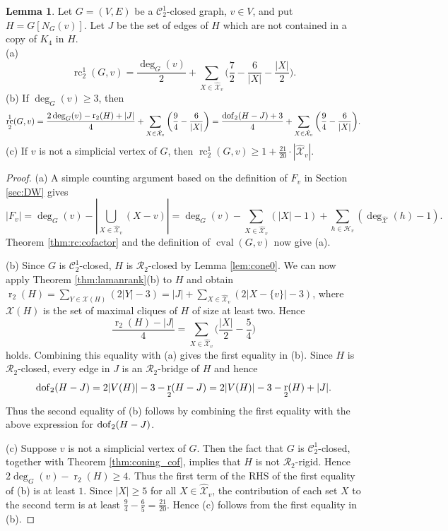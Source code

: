 \documentclass[11pt,a4paper]{article}
\theoremstyle{definition}
\newtheorem{lemma}[theorem]{Lemma}
\DeclareMathOperator{\rr}{r}
\DeclareMathOperator{\rc}{rc}
\DeclareMathOperator{\cval}{cval}
\newcommand{\cR}{\mathcal{R}}
\newcommand{\dof}{{\rm dof}}
\newcommand{\XX}{\mathcal{X}}
\newcommand{\hXX}{\hat{\mathcal{X}}}
\newcommand{\cC}{\mathcal{C}}
\newcommand{\HH}{\mathcal{H}}
\begin{document}
\begin{lemma}\label{lem:cof:bounds}
Let $G=(V,E)$ be a $\cC_2^1$-closed graph, $v\in V$, and put $H=G[N_G(v)]$.  Let $J$ be the set of edges of $H$ which are not contained in a copy of $K_4$ in $H$.\\
(a)        $$\displaystyle \rc_2^1(G,v)=\frac{\deg_G(v)}{2}+\sum_{X\in\hXX_v}\bigg(\frac{7}{2}-\frac{6}{|X|}-\frac{|X|}{2}\bigg).$$
(b) If $\deg_G(v)\geq3$, then
$$\rc_2^1(G,v)= \frac{2\deg_G(v)-\rr_2(H)+|J|}{4}+\sum_{X\in \hXX_v}\bigg(\frac{9}{4}-\frac{6}{|X|}\bigg)=\frac{\dof_2(H-J)+3}{4}+\sum_{X\in \hXX_v}\bigg(\frac{9}{4}-\frac{6}{|X|}\bigg).$$
(c) If $v$ is not a simplicial vertex of $G$, then $\rc_2^1(G,v)\geq 1+ \frac{21}{20} \cdot |\hXX_v|.$
\end{lemma}
\begin{proof}
(a) 
A simple counting argument based on the definition of $F_v$ in Section \ref{sec:DW} gives 
$$|F_v|=\deg_G(v)-\left|\bigcup_{X\in \hXX_v} (X-v)\right|=\deg_G(v)-\sum_{X\in \hXX_v}(|X|-1) + \sum_{h\in \HH_v}(\deg_{\hXX}(h)-1).$$
Theorem
\ref{thm:rc:cofactor} and the definition of $\cval(G,v)$ now give (a).\medskip

(b)  Since $G$ is $\cC_2^1$-closed,  $H$ is $\cR_2$-closed by Lemma \ref{lem:cone0}. We can now apply
Theorem \ref{thm:lamanrank}(b) to $H$ and obtain 
$\rr_2(H)=\sum_{Y\in\XX(H)}(2|Y|-3)=|J|+\sum_{X\in\hXX_v}(2|X-\{v\}|-3)$, where $\XX(H)$ is the set of maximal cliques of $H$ of size at least two.
Hence $$\frac{\rr_2(H)-|J|}{4}=\sum_{X\in\hXX_v}\Big(\frac{|X|}{2}-\frac{5}{4}\Big)$$ holds.
Combining this equality with (a) gives 
the first equality in 
(b).
Since $H$ is $\cR_2$-closed,
every edge in $J$ is an $\cR_2$-bridge of $H$ and hence 
$$\dof_2(H-J)=2|V(H)|-3-\rr_2(H-J)=2|V(H)|-3-\rr_2(H)+|J|.$$
Thus the second equality of (b) follows by combining the first equality with the above expression for  $\dof_2(H-J)$.


\medskip

(c) Suppose $v$ is not a simplicial vertex of $G$. Then the fact that $G$ is $\cC_2^1$-closed,
together with Theorem \ref{thm:coning_cof}, 
implies that $H$ is not $\mathcal{R}_2$-rigid. Hence $2\deg_G(v)-\rr_2(H)\geq 4$. 
Thus the first term of the RHS of the first equality of (b) is at least $1$. Since $|X|\geq 5$ for
all $X\in \hXX_v$, the contribution of each set $X$ to the second term is at least
$\frac{9}{4}-\frac{6}{5}=\frac{21}{20}$. Hence
(c) follows from the first equality in (b).
\end{proof}
\end{document}
